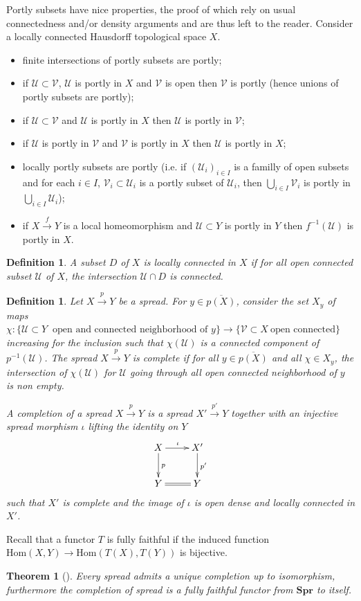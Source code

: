 \documentclass[a4paper,12pt]{article}
\newtheorem{thm}{Theorem}    %
\newtheorem{defi}[lem]{Definition}    %
\def\U{\mathcal U}
\def\Hom{\mathrm{Hom}}
\def\V{\mathcal V}
\def\V{\mathcal V}
\def\U{\mathcal{U}}
\def\Hom{\mathrm{Hom}}
\def\CatSpread{\mathbf{Spr}}
\begin{document}
Portly subsets have nice properties, the proof of which rely on usual connectedness and/or density arguments and are thus left to the reader. Consider a locally connected Hausdorff topological space $X$.
\begin{itemize}
 \item finite intersections of portly subsets are portly;
 \item if $\U\subset \V$, $\U$ is portly in $X$ and $\V$ is open then $\V$ is portly (hence unions of portly subsets are portly);
 \item if $\U\subset \V$ and $\U$ is portly in $X$ then $\U$ is portly in $\V$;
 \item if $\U$ is portly in $\V$ and $\V$ is portly in $X$ then $\U$ is portly in $X$;

 \item locally portly subsets are portly (i.e. if $(\U_i)_{i\in I}$ is a familly of open subsets and for each $i\in I$, $\V_i\subset \U_i$ is a portly subset of $\U_i$, then $\bigcup_{i\in I}\V_i$ is portly in $\bigcup_{i\in I}\U_i$);
 \item if $X\xrightarrow{f} Y$ is a local homeomorphism and $\U\subset Y$ is portly in $Y$ then $f^{-1}(\U)$ is portly in $X$.
\end{itemize}



\begin{defi}\label{def:subset_locally_connected_all} A subset $D$ of $X$ is locally connected in $X$ if for all open connected subset $\U$ of $X$, the intersection $\U\cap D$ is connected.
\end{defi}


\begin{defi}\label{def:spread_consider_set_maps} Let  $X\xrightarrow{p} Y$ be a spread. For $y\in \overline{p(X)}$, consider the set $X_y$ of maps $\chi : \{\U\subset Y ~ \text{ open and connected neighborhood of }y\} \rightarrow \{\V\subset X ~ \text{open connected}\}$ increasing for the inclusion such that $\chi(\U)$ is a connected component of $p^{-1}(\U)$.
The spread $X\xrightarrow{p} Y$ is complete if for all $y\in \overline{p(X)}$ and all $\chi \in X_y$, the intersection of $\chi(\U)$ for $\U$ going through all open connected neighborhood of $y$ is non empty.


A completion of a spread $X\xrightarrow{p} Y$ is a spread $X'\xrightarrow{p'} Y$ together with an injective spread morphism $\iota$ lifting the identity on $Y$
$$\xymatrix{
X\ar[d]^p \ar[r]^\iota & X' \ar[d]^{p'} \\ Y \ar@{=}[r] & Y
} $$
such that $X'$ is complete and the image of $\iota$ is open dense and locally connected in $X'$.
\end{defi}
Recall that a functor $T$ is fully faithful if the induced function $\Hom(X,Y) \rightarrow \Hom(T(X),T(Y))$ is bijective.
\begin{thm}[\cite{MR0123298,MR2198590}] \label{theo:Fox_completion_functor}
 Every spread admits a unique completion up to isomorphism, furthermore the completion of spread is a fully faithful functor  from $\CatSpread$ to itself.
\end{thm}
\end{document}
